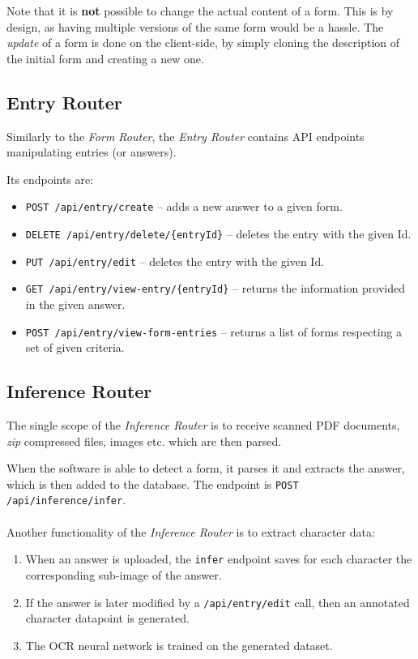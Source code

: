 \documentclass[12pt, a4paper]{report}
\def\code#1{\texttt{#1}}
\begin{document}
Note that it is \textbf{not} possible to change the actual content of a form. This is by design, as having multiple versions of the same form would be a hassle. The \textit{update} of a form is done on the client-side, by simply cloning the description of the initial form and creating a new one.

\subsection{Entry Router}

Similarly to the \textit{Form Router}, the \textit{Entry Router} contains API endpoints manipulating entries (or answers).

Its endpoints are:
\begin{itemize}
    \item \code{POST /api/entry/create} -- adds a new answer to a given form.
    \item \code{DELETE /api/entry/delete/\{entryId\}} -- deletes the entry with the given Id.
    \item \code{PUT /api/entry/edit} -- deletes the entry with the given Id.
    \item \code{GET /api/entry/view-entry/\{entryId\}} -- returns the information provided in the given answer.
    \item \code{POST /api/entry/view-form-entries} -- returns a list of forms respecting a set of given criteria.
\end{itemize}

\subsection{Inference Router}

The single scope of the \textit{Inference Router} is to receive scanned PDF documents, \textit{zip} compressed files, images etc. which are then parsed.

When the software is able to detect a form, it parses it and extracts the answer, which is then added to the database. The endpoint is \code{POST /api/inference/infer}.
\\ \\
Another functionality of the \textit{Inference Router} is to extract character data:
\begin{enumerate}
    \item When an answer is uploaded, the \code{infer} endpoint saves for each character the corresponding sub-image of the answer.
    \item If the answer is later modified by a \code{/api/entry/edit} call, then an annotated character datapoint is generated.
    \item The OCR neural network is trained on the generated dataset.
\end{enumerate}
\end{document}
